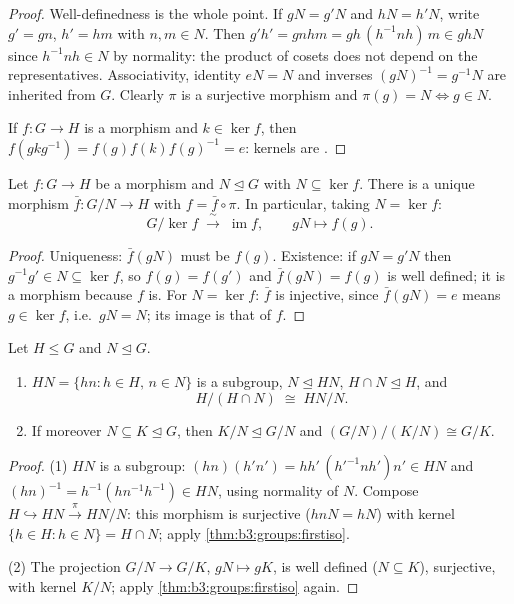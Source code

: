 \begin{proof}
Well-definedness is the whole point. If $gN = g'N$ and $hN = h'N$,
write $g' = gn$, $h' = hm$ with $n, m \in N$. Then $g'h' = gnhm =
gh\,(h^{-1}nh)\,m \in ghN$ since $h^{-1}nh \in N$ by normality: the
product of cosets does not depend on the representatives.
Associativity, identity $eN = N$ and inverses $(gN)^{-1} = g^{-1}N$
are inherited from $G$. Clearly $\pi$ is a surjective morphism and
$\pi(g) = N \iff g \in N$.

If $f \colon G \to H$ is a morphism and $k \in \ker f$, then
$f(gkg^{-1}) = f(g)f(k)f(g)^{-1} = e$: kernels are .
\end{proof}

\begin{theorem}
\label{thm:b3:groups:firstiso}
Let $f \colon G \to H$ be a morphism and $N \trianglelefteq G$ with
$N \subseteq \ker f$. There is a unique morphism $\bar f \colon G/N
\to H$ with $f = \bar f \circ \pi$. In particular, taking $N = \ker
f$:
\[
G/\ker f \;\xrightarrow{\;\sim\;}\; \operatorname{im} f,
\qquad gN \mapsto f(g).
\]
\end{theorem}

\begin{proof}
Uniqueness: $\bar f(gN)$ must be $f(g)$. Existence: if $gN = g'N$
then $g^{-1}g' \in N \subseteq \ker f$, so $f(g) = f(g')$ and $\bar
f(gN) = f(g)$ is well defined; it is a morphism because $f$ is. For
$N = \ker f$: $\bar f$ is injective, since $\bar f(gN) = e$ means
$g \in \ker f$, i.e.\ $gN = N$; its image is that of $f$.
\end{proof}

\begin{theorem}
\label{thm:b3:groups:secondiso}
Let $H \leq G$ and $N \trianglelefteq G$.
\begin{enumerate}
  \item $HN = \{hn : h \in H,\, n \in N\}$ is a subgroup, $N
        \trianglelefteq HN$, $H \cap N \trianglelefteq H$, and
        \[
        H/(H \cap N) \;\cong\; HN/N .
        \]
  \item If moreover $N \subseteq K \trianglelefteq G$, then $K/N
        \trianglelefteq G/N$ and $(G/N)\big/(K/N) \cong G/K$.
\end{enumerate}
\end{theorem}

\begin{proof}
(1) $HN$ is a subgroup: $(hn)(h'n') = hh'\,(h'^{-1}nh')n' \in HN$
and $(hn)^{-1} = h^{-1}(hn^{-1}h^{-1}) \in HN$, using normality of
$N$. Compose $H \hookrightarrow HN \xrightarrow{\pi} HN/N$: this
morphism is surjective ($hnN = hN$) with kernel $\{h \in H : h \in
N\} = H \cap N$; apply \cref{thm:b3:groups:firstiso}.

(2) The projection $G/N \to G/K$, $gN \mapsto gK$, is well defined
($N \subseteq K$), surjective, with kernel $K/N$; apply
\cref{thm:b3:groups:firstiso} again.
\end{proof}


